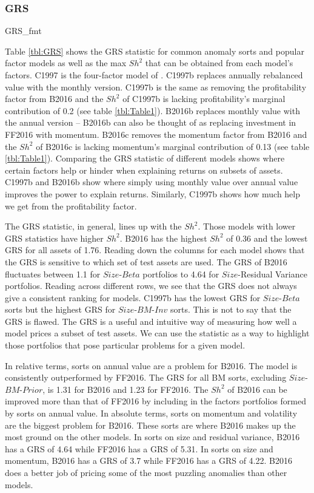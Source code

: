 
\subsubsection{GRS}

{GRS_fmt}

Table \ref{tbl:GRS} shows the GRS statistic for common anomaly sorts and popular factor
models as well as the max $Sh^2$ that can be obtained from each model's factors. C1997 is
the four-factor model of \textcite{carhart1997persistence}. C1997b replaces annually
rebalanced value with the monthly version. C1997b is the same as removing the
profitability factor from B2016 and the $Sh^2$ of C1997b is lacking profitability's
marginal contribution of 0.2 (see table \ref{tbl:Table1}). B2016b replaces monthly value
with the annual version -- B2016b can also be thought of as replacing investment in FF2016
with momentum. B2016c removes the momentum factor from B2016 and the $Sh^2$ of B2016c is
lacking momentum's marginal contribution of 0.13 (see table \ref{tbl:Table1}). Comparing
the GRS statistic of different models shows where certain factors help or hinder when
explaining returns on subsets of assets. C1997b and B2016b show where simply using monthly
value over annual value improves the power to explain returns. Similarly, C1997b shows how
much help we get from the profitability factor.

The GRS statistic, in general, lines up with the $Sh^2$. Those models with lower GRS
statistics have higher $Sh^2$. B2016 has the highest $Sh^2$ of 0.36 and the lowest GRS for
all assets of 1.76. Reading down the columns for each model shows that the GRS is
sensitive to which set of test assets are used. The GRS of B2016 fluctuates between 1.1
for $Size$-$Beta$ portfolios to 4.64 for $Size$-Residual Variance portfolios. Reading
across different rows, we see that the GRS does not always give a consistent ranking for
models. C1997b has the lowest GRS for $Size$-$Beta$ sorts but the highest GRS for
$Size$-$BM$-$Inv$ sorts. This is not to say that the GRS is flawed. The GRS is a useful
and intuitive way of measuring how well a model prices a subset of test assets. We can use
the statistic as a way to highlight those portfolios that pose particular problems for a
given model.

In relative terms, sorts on annual value are a problem for B2016. The model is
consistently outperformed by FF2016. The GRS for all BM sorts, excluding
$Size$-$BM$-$Prior$, is 1.31 for B2016 and 1.23 for FF2016. The $Sh^2$ of B2016 can be
improved more than that of FF2016 by including in the factors portfolios formed by sorts
on annual value. In absolute terms, sorts on momentum and volatility are the biggest
problem for B2016. These sorts are where B2016 makes up the most ground on the other
models. In sorts on size and residual variance, B2016 has a GRS of 4.64 while FF2016 has a
GRS of 5.31. In sorts on size and momentum, B2016 has a GRS of 3.7 while FF2016 has a GRS
of 4.22. B2016 does a better job of pricing some of the most puzzling anomalies
\parencite{fama2016dissecting} than other models.


